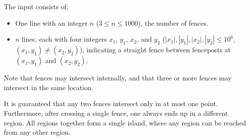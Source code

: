
  The input consists of:
  \begin{itemize}
    \item One line with an integer $n$ ($3 \le n \le 1000$), the number of fences.
    \item $n$ lines, each with four integers $x_1$, $y_1$, $x_2$, and $y_2$
  ($\left|x_1\right|, \left|y_1\right|, \left|x_2\right|, \left|y_2\right|\leq 10^6$, $(x_1,y_1)\neq(x_2,y_2)$), indicating a straight fence between
  fenceposts at $(x_1,y_1)$ and $(x_2, y_2)$.
  \end{itemize}

  Note that fences may intersect internally, and that three or more fences may intersect in the same location.

  It is guaranteed that any two fences intersect only in at most one point.
  Furthermore, after crossing a single fence, one always ends up in a different region.
  All regions together form a single island, where any region can be reached from any other region.
